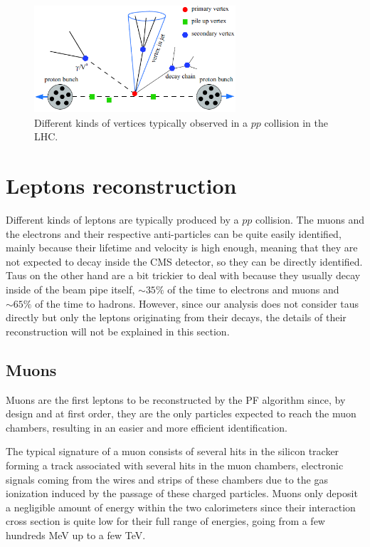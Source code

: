 \documentclass[a4paper, 10pt, openright]{report}
\begin{document}
\begin{figure}[htbp]
\begin{center}
\includegraphics[width=7.5cm, height=4cm]{figs/LHCPU.png}
\caption{Different kinds of vertices typically observed in a $pp$ collision in the \ac{LHC}.}
\label{fig:LHCPU}
\end{center}
\end{figure}

\section{Leptons reconstruction} \label{section:RecoLep}

Different kinds of leptons are typically produced by a $pp$ collision. The muons and the electrons and their respective anti-particles can be quite easily identified, mainly because their lifetime and velocity is high enough, meaning that they are not expected to decay inside the \ac{CMS} detector, so they can be directly identified. Taus on the other hand are a bit trickier to deal with because they usually decay inside of the beam pipe itself, $\sim 35\%$ of the time to electrons and muons and $\sim 65\%$ of the time to hadrons. However, since our analysis does not consider taus directly but only the leptons originating from their decays, the details of their reconstruction will not be explained in this section.

\subsection{Muons} \label{subsection:Muons}

Muons are the first leptons to be reconstructed by the \ac{PF} algorithm since, by design and at first order, they are the only particles expected to reach the muon chambers, resulting in an easier and more efficient identification. 

The typical signature of a muon consists of several hits in the silicon tracker forming a track associated with several hits in the muon chambers, electronic signals coming from the wires and strips of these chambers due to the gas ionization induced by the passage of these charged particles. Muons only deposit a negligible amount of energy within the two calorimeters since their interaction cross section is quite low for their full range of energies, going from a few hundreds MeV up to a few TeV.
\end{document}
